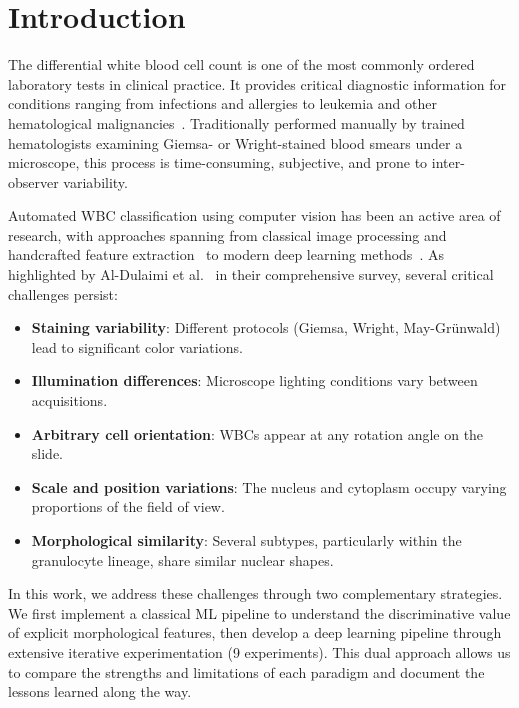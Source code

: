 \documentclass[twocolumn,a4paper]{article}
\begin{document}
\section{Introduction}

The differential white blood cell count is one of the most commonly ordered laboratory tests in clinical practice. It provides critical diagnostic information for conditions ranging from infections and allergies to leukemia and other hematological malignancies~\cite{aldulaimi2018}. Traditionally performed manually by trained hematologists examining Giemsa- or Wright-stained blood smears under a microscope, this process is time-consuming, subjective, and prone to inter-observer variability.

Automated WBC classification using computer vision has been an active area of research, with approaches spanning from classical image processing and handcrafted feature extraction~\cite{rezatofighi2011, gautam2014} to modern deep learning methods~\cite{qin2018, togacar2020}. As highlighted by Al-Dulaimi et al.~\cite{aldulaimi2018} in their comprehensive survey, several critical challenges persist:

\begin{itemize}
    \item \textbf{Staining variability}: Different protocols (Giemsa, Wright, May-Gr\"unwald) lead to significant color variations.
    \item \textbf{Illumination differences}: Microscope lighting conditions vary between acquisitions.
    \item \textbf{Arbitrary cell orientation}: WBCs appear at any rotation angle on the slide.
    \item \textbf{Scale and position variations}: The nucleus and cytoplasm occupy varying proportions of the field of view.
    \item \textbf{Morphological similarity}: Several subtypes, particularly within the granulocyte lineage, share similar nuclear shapes.
\end{itemize}

In this work, we address these challenges through two complementary strategies. We first implement a classical ML pipeline to understand the discriminative value of explicit morphological features, then develop a deep learning pipeline through extensive iterative experimentation (9 experiments). This dual approach allows us to compare the strengths and limitations of each paradigm and document the lessons learned along the way.
\end{document}
